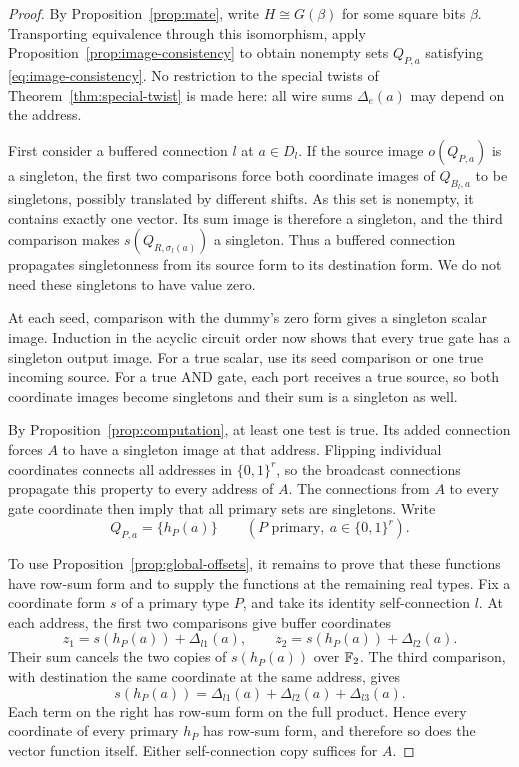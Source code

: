 \begin{proof}
By Proposition~\ref{prop:mate}, write \(H\cong G(\beta)\) for some square
bits \(\beta\).  Transporting equivalence through this isomorphism, apply
Proposition~\ref{prop:image-consistency} to obtain nonempty sets
\(Q_{P,a}\) satisfying \eqref{eq:image-consistency}.  No restriction to the
special twists of Theorem~\ref{thm:special-twist} is made here: all wire sums
\(\Delta_e(a)\) may depend on the address.

First consider a buffered connection \(l\) at \(a\in D_l\).  If the source
image \(o(Q_{P,a})\) is a singleton, the first two comparisons force both
coordinate images of \(Q_{B_l,a}\) to be singletons, possibly translated by
different shifts.  As this set is nonempty, it contains exactly one vector.
Its sum image is therefore a singleton, and the third comparison makes
\(s(Q_{R,\sigma_l(a)})\) a singleton.  Thus a buffered connection propagates
singletonness from its source form to its destination form.  We do not need
these singletons to have value zero.

At each seed, comparison with the dummy's zero form gives a singleton scalar
image.  Induction in the acyclic circuit order now shows that every true gate
has a singleton output image.  For a true scalar, use its seed comparison or
one true incoming source.  For a true AND gate, each port receives a true
source, so both coordinate images become singletons and their sum is a
singleton as well.

By Proposition~\ref{prop:computation}, at least one test is true.  Its added
connection forces \(A\) to have a singleton image at that address.  Flipping
individual coordinates connects all addresses in \(\{0,1\}^r\), so the
broadcast connections propagate this property to every address of \(A\).
The connections from \(A\) to every gate coordinate then imply that all
primary sets are singletons.  Write
\[
 Q_{P,a}=\{h_P(a)\}
 \qquad(P\text{ primary},\ a\in\{0,1\}^r).
\]

To use Proposition~\ref{prop:global-offsets}, it remains to prove that these
functions have row-sum form and to supply the functions at the remaining real
types.  Fix a coordinate form \(s\) of a primary type \(P\), and take its
identity self-connection \(l\).  At each address, the first two comparisons
give buffer coordinates
\[
 z_1=s(h_P(a))+\Delta_{l1}(a),\qquad
 z_2=s(h_P(a))+\Delta_{l2}(a).
\]
Their sum cancels the two copies of \(s(h_P(a))\) over \(\mathbb F_2\).  The third
comparison, with destination the same coordinate at the same address, gives
\begin{equation}
 s(h_P(a))=\Delta_{l1}(a)+\Delta_{l2}(a)+\Delta_{l3}(a).
 \label{eq:self-connection-row-sum}
\end{equation}
Each term on the right has row-sum form on the full product.  Hence every
coordinate of every primary \(h_P\) has row-sum form, and therefore so does
the vector function itself.  Either self-connection copy suffices for \(A\).


\end{proof}
